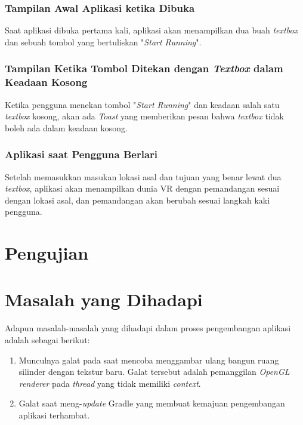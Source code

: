 \subsubsection{Tampilan Awal Aplikasi ketika Dibuka}
Saat aplikasi dibuka pertama kali, aplikasi akan menampilkan dua buah \textit{textbox} dan sebuah tombol yang bertuliskan "\textit{Start Running}". 

\subsubsection{Tampilan Ketika Tombol Ditekan dengan \textit{Textbox} dalam Keadaan Kosong}
Ketika pengguna menekan tombol "\textit{Start Running}" dan keadaan salah satu \textit{textbox} kosong, akan ada \textit{Toast} yang memberikan pesan bahwa \textit{textbox} tidak boleh ada dalam keadaan kosong.

\subsubsection{Aplikasi saat Pengguna Berlari}
Setelah memasukkan masukan lokasi asal dan tujuan yang benar lewat dua \textit{textbox}, aplikasi akan menampilkan dunia VR dengan pemandangan sesuai dengan lokasi asal, dan pemandangan akan berubah sesuai langkah kaki pengguna. 



\section{Pengujian}



\section{Masalah yang Dihadapi}
Adapun masalah-masalah yang dihadapi dalam proses pengembangan aplikasi adalah sebagai berikut:

\begin{enumerate}
	\item Munculnya galat pada saat mencoba menggambar ulang bangun ruang silinder dengan tekstur baru. Galat tersebut adalah pemanggilan \textit{OpenGL renderer} pada \textit{thread} yang tidak memiliki \textit{context}. 
	
	\item Galat saat meng-\textit{update} Gradle yang membuat kemajuan pengembangan aplikasi terhambat. 
\end{enumerate}

